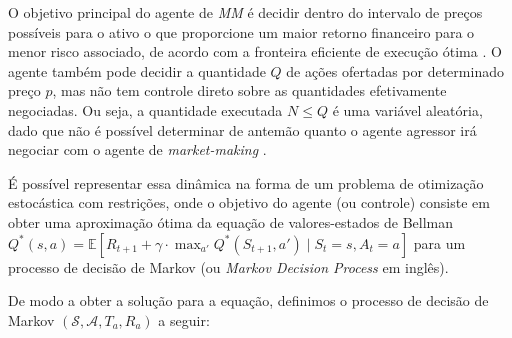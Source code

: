 O objetivo principal do agente de \textit{MM} é decidir dentro do intervalo de preços possíveis para o ativo o que proporcione um maior retorno financeiro para o menor risco associado, de acordo com a fronteira eficiente de execução ótima \citep{almgren2000}. O agente também pode decidir a quantidade $Q$ de ações ofertadas por determinado preço $p$, mas não tem controle direto sobre as quantidades efetivamente negociadas. Ou seja, a quantidade executada $N \leq Q$ é uma variável aleatória, dado que não é possível determinar de antemão quanto o agente agressor irá negociar com o agente de \textit{market-making} \citep{rao2020stochastic}.

É possível representar essa dinâmica na forma de um problema de otimização estocástica com restrições, onde o objetivo do agente (ou controle) consiste em obter uma aproximação ótima da equação de valores-estados de Bellman $Q^*(s, a) = \mathbb{E} \left[ R_{t+1} + \gamma \cdot \max_{a'} Q^*(S_{t+1}, a') \mid S_t = s, A_t = a \right]$ para um processo de decisão de Markov (ou \textit{Markov Decision Process} em inglês).

De modo a obter a solução para a equação, definimos o processo de decisão de Markov $(\mathcal{S}, \mathcal{A}, T_{a}, R_{a})$ a seguir:

